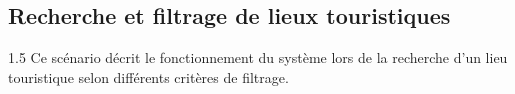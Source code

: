 \documentclass[a4paper,12pt]{report}
\newcommand{\actbar}[3]{\draw[hw] (#1-0.28,#2) rectangle (#1+0.28,#3);}
\newcommand{\seqA}[4]{\draw[seqmsg] (#1,#3) -- node[above,seqlbl]{#4} (#2,#3);}
\newcommand{\seqR}[4]{\draw[seqret] (#1,#3) -- node[above,seqlbl]{#4} (#2,#3);}
\newcommand{\CPA}{0}
\newcommand{\CPB}{5.5}
\newcommand{\CPC}{12}
\newcommand{\CPD}{18.5}
\newcommand{\CPE}{25}
\begin{document}
 \subsection{Recherche et filtrage de lieux touristiques}
 \vspace{0.5cm}
 \begin{spacing}{1.5}
 \justifying
 Ce scénario décrit le fonctionnement du système lors de la recherche d'un lieu touristique selon différents critères de filtrage.
    
    
    
    
    
    

\end{spacing}
\end{document}
